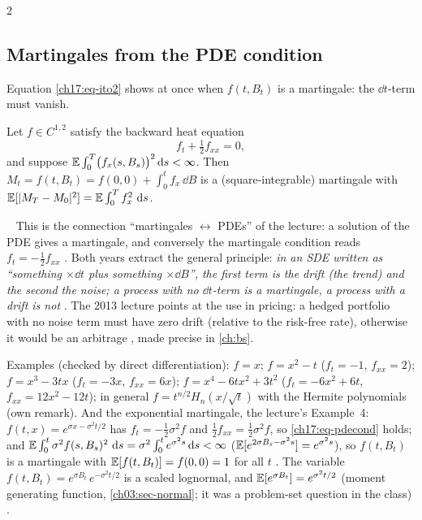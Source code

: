 \begin{paracol}{2}
\subsection{Martingales from the PDE condition}\label{ch17:sec-pde}
Equation \eqref{ch17:eq-ito2} shows at once when $f(t,B_t)$ is a martingale: the $\dd t$-term must vanish.

\begin{theorem}\label{ch17:thm-pde}
Let $f\in C^{1,2}$ satisfy the backward heat equation
\begin{equation}\label{ch17:eq-pdecond}
  f_t+\tfrac12f_{xx}=0 ,
\end{equation}
and suppose $\mathbb{E}\int_0^T\bigl(f_x(s,B_s)\bigr)^2\,\mathrm{d} s<\infty$. Then $M_t=f(t,B_t)=f(0,0)+\int_0^tf_x\,\dd B$ is a (square-integrable) martingale with $\mathbb{E}[|M_T-M_0|^2]=\mathbb{E}\int_0^Tf_x^2\,\,\mathrm{d} s$.
\end{theorem}
\ \noindent
This is the connection ``martingales $\leftrightarrow$ PDEs'' of the lecture: a solution of the PDE gives a martingale, and conversely the
martingale condition reads $f_t=-\tfrac12f_{xx}$ . Both years extract the general principle:
\emph{in an SDE written as ``something $\times\dd t$ plus something $\times\dd B$'', the first term is the drift (the trend) and the second the noise; a process with no $\dd t$-term is a martingale, a process with a drift is not}
.
The 2013 lecture points at the use in pricing: a hedged portfolio with no noise term must have zero drift (relative to the risk-free rate), otherwise it would be an
arbitrage , made precise in \cref{ch:bs}.

Examples (checked by direct differentiation): $f=x$; $f=x^2-t$ ($f_t=-1$, $f_{xx}=2$); $f=x^3-3tx$ ($f_t=-3x$, $f_{xx}=6x$); $f=x^4-6tx^2+3t^2$ ($f_t=-6x^2+6t$, $f_{xx}=12x^2-12t$);
in general $f=t^{n/2}H_n(x/\sqrt t)$ with the Hermite polynomials (own remark). And the exponential martingale, the lecture's Example~4:
$f(t,x)=e^{\sigma x-\sigma^2t/2}$ has $f_t=-\tfrac12\sigma^2f$ and $\tfrac12f_{xx}=\tfrac12\sigma^2f$, so \eqref{ch17:eq-pdecond} holds; and
$\mathbb{E}\int_0^t\sigma^2f(s,B_s)^2\,\,\mathrm{d} s=\sigma^2\int_0^te^{\sigma^2s}\,\mathrm{d} s<\infty$ ($\mathbb{E}[e^{2\sigma B_s-\sigma^2s}]=e^{\sigma^2s}$), so $f(t,B_t)$ is a martingale with $\mathbb{E}[f(t,B_t)]=f(0,0)=1$ for all $t$
. The variable $f(t,B_t)=e^{\sigma B_t}\,e^{-\sigma^2t/2}$ is a scaled lognormal, and
$\mathbb{E}[e^{\sigma B_t}]=e^{\sigma^2t/2}$ (moment generating function, \cref{ch03:sec-normal}; it was a problem-set question in the class) .


\end{paracol}
